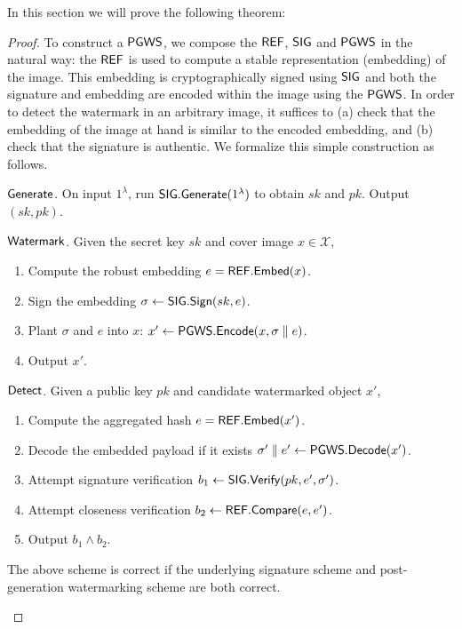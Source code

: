 \documentclass[12pt]{article}
\begin{document}
In this section we will prove the following theorem:

\main*

\begin{proof}
To construct a $\mathsf{PGWS}$, we compose the $\mathsf{REF}$, $\mathsf{SIG}$ and $\mathsf{PGWS}$ in the natural way: the $\mathsf{REF}$ is used to compute a stable representation (embedding) of the image.
This embedding is cryptographically signed using $\mathsf{SIG}$ and both the signature and embedding are encoded within the image using the $\mathsf{PGWS}$.
In order to detect the watermark in an arbitrary image, it suffices to (a) check that the embedding of the image at hand is similar to the encoded embedding, and (b) check that the signature is authentic.
We formalize this simple construction as follows.

$\mathsf{Generate}$. 
On input $1^\lambda$, run $\mathsf{SIG}.\mathsf{Generate}(1^\lambda)$ to obtain $sk$ and $pk$. 
Output $(sk, pk)$.

$\mathsf{Watermark}$. 
Given the secret key $sk$ and cover image $x \in \mathcal{X}$,
\begin{enumerate}
    \item Compute the robust embedding $e = \mathsf{REF}.\mathsf{Embed}(x)$.
    \item Sign the embedding $\sigma \gets \mathsf{SIG}.\mathsf{Sign}(sk, e)$.
    \item Plant $\sigma$ and $e$ into $x$: $x' \gets \mathsf{PGWS}.\mathsf{Encode}(x, \sigma \parallel e)$.
    \item Output $x'$.
\end{enumerate}

$\mathsf{Detect}$. Given a public key $pk$ and candidate watermarked object $x'$,
\begin{enumerate}
    \item Compute the aggregated hash $e = \mathsf{REF}.\mathsf{Embed}(x')$.
    \item Decode the embedded payload if it exists $\sigma' \parallel e' \gets \mathsf{PGWS}.\mathsf{Decode}(x')$.
    \item Attempt signature verification $b_1 \gets \mathsf{SIG}.\mathsf{Verify}(pk, e', \sigma')$.
    \item Attempt closeness verification $b_2 \gets \mathsf{REF}.\mathsf{Compare}(e, e')$.
    \item Output $b_1 \land b_2$.
\end{enumerate}

\begin{claim}\label{clm:wm_corr}
The above scheme is correct if the underlying signature scheme and post-generation watermarking scheme are both correct.
\end{claim}


\end{proof}
\end{document}

